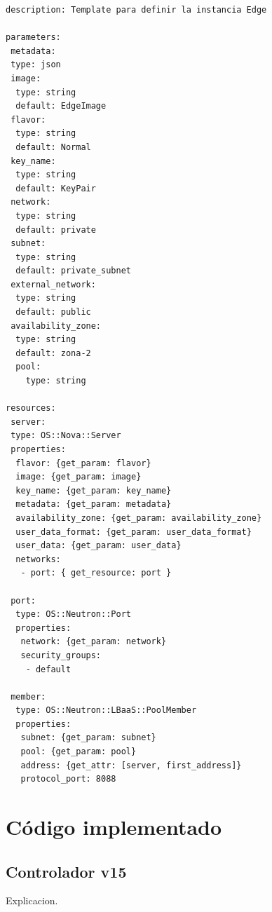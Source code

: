 \documentclass[12pt,a4paper,oneside]{book}
\begin{document}
\vspace{0,5cm}
\begin{lstlisting}[style=codigobase,  caption= lb\_edge.yaml]
description: Template para definir la instancia Edge

parameters:
 metadata:
 type: json
 image:
  type: string
  default: EdgeImage
 flavor:
  type: string
  default: Normal
 key_name:
  type: string
  default: KeyPair
 network:
  type: string
  default: private
 subnet:
  type: string
  default: private_subnet
 external_network:
  type: string
  default: public
 availability_zone:
  type: string
  default: zona-2
  pool:
    type: string

resources:
 server:
 type: OS::Nova::Server
 properties:
  flavor: {get_param: flavor}
  image: {get_param: image}
  key_name: {get_param: key_name}
  metadata: {get_param: metadata}
  availability_zone: {get_param: availability_zone}
  user_data_format: {get_param: user_data_format}
  user_data: {get_param: user_data}
  networks:
   - port: { get_resource: port }

 port:
  type: OS::Neutron::Port
  properties:
   network: {get_param: network}
   security_groups:
    - default

 member:
  type: OS::Neutron::LBaaS::PoolMember
  properties:
   subnet: {get_param: subnet}
   pool: {get_param: pool}
   address: {get_attr: [server, first_address]}
   protocol_port: 8088
\end{lstlisting}

\vspace{0,5cm}


\chapter{Código implementado}

\section{Controlador v15}
\label{codigo_controlador}
Explicacion.

\vspace{0.5cm}
\end{document}
